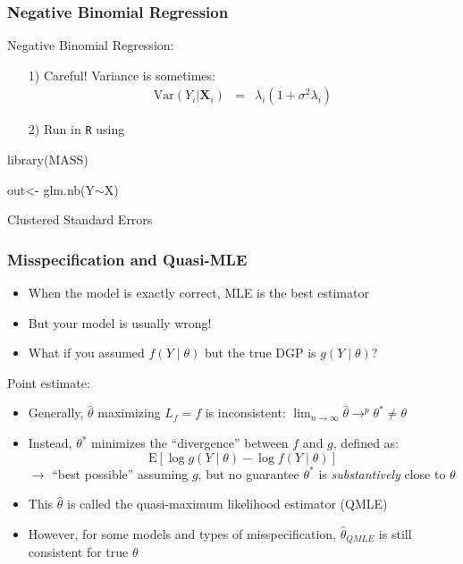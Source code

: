 \documentclass{beamer}
\begin{document}
\begin{frame}
\frametitle{Negative Binomial Regression}

Negative Binomial Regression:
\begin{itemize}
\item[1)] Careful! Variance is sometimes:
\begin{eqnarray}
\text{Var}(Y_{i}| \boldsymbol{X}_{i}) & = & \lambda_{i}(1 + \sigma^2 \lambda_{i})\nonumber
\end{eqnarray}
\item[2)] Run in {\tt R} using
\end{itemize}

\begin{semiverbatim}
library(MASS)

out<- glm.nb(Y$\sim$X)

\end{semiverbatim}

\end{frame}


\begin{frame}

\huge

Clustered Standard Errors

\end{frame}



\begin{frame}
\frametitle{Misspecification and Quasi-MLE}
\begin{itemize}[<+->]
\item When the model is exactly correct, MLE is the best estimator
\item But your model is usually wrong!
\item What if you assumed $f(Y\mid \theta)$ but the true DGP is $g(Y\mid\theta)$?
\pause
\end{itemize}
\bigskip

Point estimate:
\begin{itemize}[<+->]
\item Generally, $\hat\theta$ maximizing $L_f=f$ is \alert{inconsistent}: $\lim_{n\rightarrow\infty}
    \hat\theta \rightarrow^{p} \theta^\ast \neq \theta$
\item Instead, $\theta^\ast$ minimizes the ``divergence'' between $f$ and $g$, defined as:
$$ \text{E}\left[\log g(Y\mid \theta) - \log f(Y\mid \theta)\right] $$
$\longrightarrow$ ``best possible'' assuming $g$, but no guarantee $\theta^\ast$
is {\it substantively} close to $\theta$
\item This $\hat\theta$ is called the \alert{quasi-maximum likelihood estimator} (QMLE)
\item However, for some models and types of misspecification,
$\hat\theta_{QMLE}$ is still consistent for true $\theta$
\end{itemize}
\end{frame}
\end{document}
